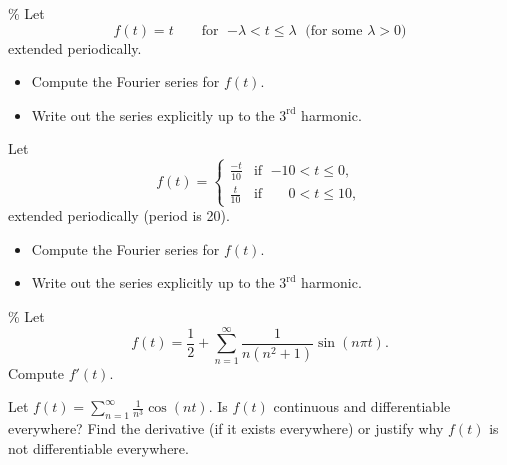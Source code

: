 \documentclass{ximera}
\begin{document}
\begin{exercise}\%
    Let
    \begin{equation*}
        f(t) = t \qquad \text{for } \; {-\lambda} < t \leq \lambda \; \text{ (for some } \lambda > 0 \text{)}
    \end{equation*}
    extended periodically.
    \begin{itemize}
        \item Compute the Fourier series for $f(t)$.
        \item Write out the series explicitly up to the $3^{\text{rd}}$ harmonic.
    \end{itemize}
\end{exercise}

\begin{exercise}
    Let
    \begin{equation*}
        f(t) =
        \begin{cases}
            \frac{-t}{10} & \text{if } \; {-10} < t \leq 0 , \\
            \frac{t}{10} & \text{if } \; \phantom{-1}0 < t \leq  10 ,
        \end{cases}
    \end{equation*}
    extended periodically (period is 20).
    \begin{itemize}
        \item Compute the Fourier series for $f(t)$.
        \item Write out the series explicitly up to the $3^{\text{rd}}$ harmonic.
    \end{itemize}
\end{exercise}

\begin{exercise}\%
    Let
    \begin{equation*}
        f(t) = \frac{1}{2} + \sum_{n=1}^\infty \frac{1}{n(n^2+1)} \sin(n\pi t) .
    \end{equation*}
    Compute $f'(t)$.
\end{exercise}

\begin{exercise}
    Let $f(t) = \sum_{n=1}^\infty \frac{1}{n^3} \cos (n t)$.  Is $f(t)$ continuous and differentiable everywhere?  Find the derivative (if it exists everywhere) or justify why $f(t)$ is not differentiable everywhere.
\end{exercise}
\end{document}
